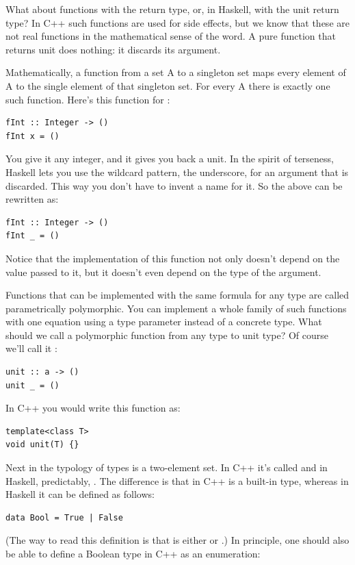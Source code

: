 What about functions with the  return type, or, in Haskell,
with the unit return type? In C++ such functions are used for side
effects, but we know that these are not real functions in the
mathematical sense of the word. A pure function that returns unit does
nothing: it discards its argument.

Mathematically, a function from a set A to a singleton set maps every
element of A to the single element of that singleton set. For every A
there is exactly one such function. Here's this function for
:

\begin{verbatim}
fInt :: Integer -> ()
fInt x = ()
\end{verbatim}
You give it any integer, and it gives you back a unit. In the spirit of
terseness, Haskell lets you use the wildcard pattern, the underscore,
for an argument that is discarded. This way you don't have to invent a
name for it. So the above can be rewritten as:

\begin{verbatim}
fInt :: Integer -> ()
fInt _ = ()
\end{verbatim}
Notice that the implementation of this function not only doesn't depend
on the value passed to it, but it doesn't even depend on the type of the
argument.

Functions that can be implemented with the same formula for any type are
called parametrically polymorphic. You can implement a whole family of
such functions with one equation using a type parameter instead of a
concrete type. What should we call a polymorphic function from any type
to unit type? Of course we'll call it :

\begin{verbatim}
unit :: a -> ()
unit _ = ()
\end{verbatim}
In C++ you would write this function as:

\begin{verbatim}
template<class T>
void unit(T) {}
\end{verbatim}
Next in the typology of types is a two-element set. In C++ it's called
 and in Haskell, predictably, . The difference
is that in C++  is a built-in type, whereas in Haskell it
can be defined as follows:

\begin{verbatim}
data Bool = True | False
\end{verbatim}
(The way to read this definition is that  is either
 or .) In principle, one should also be able
to define a Boolean type in C++ as an enumeration:

